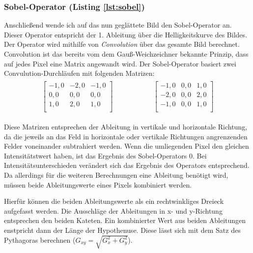 \subsubsection{Sobel-Operator (Listing \ref{lst:sobel})}
Anschließend wende ich auf das nun geglättete Bild den Sobel-Operator an. Dieser Operator entspricht der 1. Ableitung über die Helligkeitskurve des Bildes. Der Operator wird mithilfe von \textit{Convolution} über das gesamte Bild berechnet. Convolution ist das bereits vom dem Gauß-Weichzeichner bekannte Prinzip, dass auf jedes Pixel eine Matrix angewandt wird. Der Sobel-Operator basiert zwei Convulution-Durchläufen mit folgenden Matrizen:
\begin{gather}
	\begin{split}
		\begin{bmatrix}
			-1,0&-2,0&-1,0\\
			0,0&0,0&0,0\\
			1,0&2,0&1,0\\
		\end{bmatrix}
	\end{split}
	\hspace{5em}
	\begin{split}
		\begin{bmatrix}
			-1,0&0,0&1,0\\
			-2,0&0,0&2,0\\
			-1,0&0,0&1,0\\
		\end{bmatrix}
	\end{split}
\end{gather}

Diese Matrizen entsprechen der Ableitung in vertikale und horizontale Richtung, da die jeweils an das Feld in horizontale oder vertikale Richtungen angrenzenden Felder voneinander subtrahiert werden.
Wenn die umliegenden Pixel den gleichen Intensitätstwert haben, ist das Ergebnis des Sobel-Operators 0.
Bei Intensitätsunterschieden verändert sich das Ergebnis des Operators entsprechend.
Da allerdings für die weiteren Berechnungen eine Ableitung benötigt wird, müssen beide Ableitungswerte eines Pixels kombiniert werden.

Hierfür können die beiden Ableitungswerte als ein rechtwinkliges Dreieck aufgefasst werden. Die Ausschläge der Ableitungen in x- und y-Richtung entsprechen den beiden Kateten. Ein kombinierter Wert aus beiden Ableitungen enstpricht dann der Länge der Hypothenuse. Diese lässt sich mit dem Satz des Pythagoras berechnen (\(G_{xy} = \sqrt{G_x^2 + G_y^2}\)).

